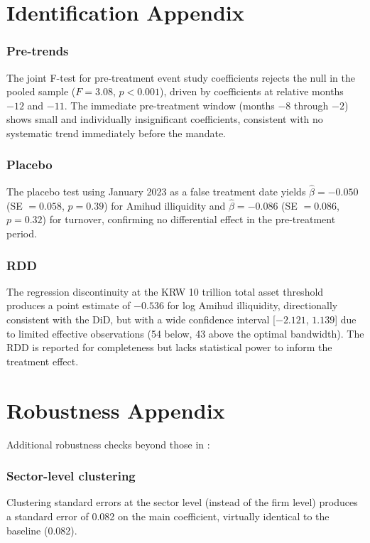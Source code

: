 \documentclass[12pt]{article}
\begin{document}
\section{Identification Appendix}

\subsubsection*{Pre-trends} The joint F-test for pre-treatment event study coefficients rejects the null in the pooled sample ($F = 3.08$, $p < 0.001$), driven by coefficients at relative months $-12$ and $-11$. The immediate pre-treatment window (months $-8$ through $-2$) shows small and individually insignificant coefficients, consistent with no systematic trend immediately before the mandate.

\subsubsection*{Placebo} The placebo test using January 2023 as a false treatment date yields $\hat{\beta} = -0.050$ (SE $= 0.058$, $p = 0.39$) for Amihud illiquidity and $\hat{\beta} = -0.086$ (SE $= 0.086$, $p = 0.32$) for turnover, confirming no differential effect in the pre-treatment period.

\subsubsection*{RDD} The regression discontinuity at the KRW 10 trillion total asset threshold produces a point estimate of $-0.536$ for log Amihud illiquidity, directionally consistent with the DiD, but with a wide confidence interval [$-2.121$, $1.139$] due to limited effective observations (54 below, 43 above the optimal bandwidth). The RDD is reported for completeness but lacks statistical power to inform the treatment effect.

\section{Robustness Appendix}

Additional robustness checks beyond those in :

\subsubsection*{Sector-level clustering} Clustering standard errors at the sector level (instead of the firm level) produces a standard error of 0.082 on the main coefficient, virtually identical to the baseline (0.082).
\end{document}
